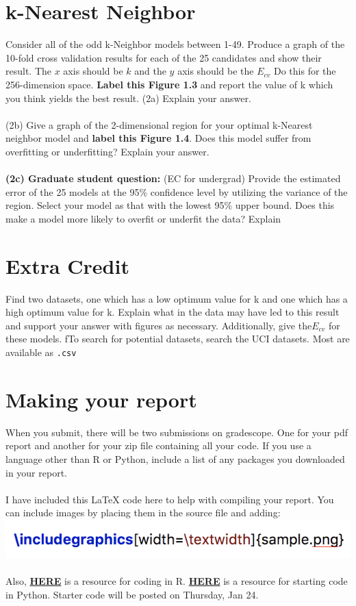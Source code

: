\documentclass[12pt]{article}
\begin{document}
\section{k-Nearest Neighbor}
Consider all of the odd k-Neighbor models between 1-49. Produce a graph of the 10-fold cross validation results for each of the 25 candidates and show their result. The $x$ axis should be $k$ and the $y$ axis should be the $E_{cv}$ Do this for the 256-dimension space. \textbf{Label this Figure 1.3} and report the value of k which you think yields the best result. (2a) Explain your answer.\\
\\
(2b) Give a graph of the 2-dimensional region for your optimal k-Nearest neighbor model and \textbf{label this Figure 1.4}. Does this model suffer from overfitting or underfitting? Explain your answer.\\
\\
\textbf{(2c) Graduate student question:} (EC for undergrad) Provide the estimated error of the 25 models at the 95\% confidence level by utilizing the variance of the region. Select your model as that with the lowest 95\% upper bound. Does this make a model more likely to overfit or underfit the data? Explain\\
\section{Extra Credit}
Find two datasets, one which has a low optimum value for k and one which has a high optimum value for k. Explain what in the data may have led to this result and support your answer with figures as necessary. Additionally, give the$E_{cv}$ for these models. fTo search for potential datasets, search the UCI datasets. Most are available as \texttt{.csv}
\section*{Making your report}
When you submit, there will be two submissions on gradescope. One for your pdf report and another for your zip file containing all your code. If you use a language other than R or Python, include a list of any packages you downloaded in your report.\\
\\
I have included this LaTeX code here to help with compiling your report. You can include images by placing them in the source file and adding:\\
\includegraphics{sample.png}
\\
\\
Also, \href{https://www.datacamp.com/community/tutorials/machine-learning-in-r}{\textbf{HERE}} is a resource for coding in R. \href{https://scikit-learn.org/stable/modules/neighbors.html}{\textbf{HERE}} is a resource for starting code in Python. Starter code will be posted on Thursday, Jan 24.
\end{document}
